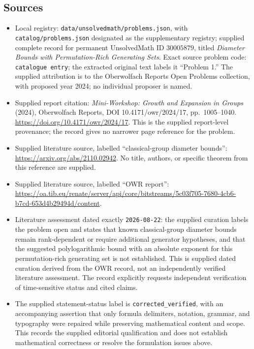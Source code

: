 \documentclass[11pt]{article}
\begin{document}
\subsection{Sources}
\begin{itemize}
\item Local registry: \texttt{data/unsolvedmath/problems.json}, with \texttt{catalog/problems.json} designated as the supplementary registry; supplied complete record for permanent UnsolvedMath ID \(30005879\), titled \emph{Diameter Bounds with Permutation-Rich Generating Sets}. Exact source problem code: \texttt{catalogue entry}; the extracted original text labels it ``Problem 1.'' The supplied attribution is to the Oberwolfach Reports Open Problems collection, with proposed year 2024; no individual proposer is named.
\item Supplied report citation: \emph{Mini-Workshop: Growth and Expansion in Groups} (2024), Oberwolfach Reports, DOI 10.4171/owr/2024/17, pp.\ 1005--1040. \url{https://doi.org/10.4171/owr/2024/17}. This is the supplied report-level provenance; the record gives no narrower page reference for the problem.
\item Supplied literature source, labelled ``classical-group diameter bounds'': \url{https://arxiv.org/abs/2110.02942}. No title, authors, or specific theorem from this reference are supplied.
\item Supplied literature source, labelled ``OWR report'': \url{https://oa.tib.eu/renate/server/api/core/bitstreams/5c03f705-7680-4cb6-b7cd-653d4b29494d/content}.
\item Literature assessment dated exactly \texttt{2026-08-22}: the supplied curation labels the problem open and states that known classical-group diameter bounds remain rank-dependent or require additional generator hypotheses, and that the suggested polylogarithmic bound with an absolute exponent for this permutation-rich generating set is not established. This is supplied dated curation derived from the OWR record, not an independently verified literature assessment. The record explicitly requests independent verification of time-sensitive status and cited claims.
\item The supplied statement-status label is \texttt{corrected\_verified}, with an accompanying assertion that only formula delimiters, notation, grammar, and typography were repaired while preserving mathematical content and scope. This records the supplied editorial qualification and does not establish mathematical correctness or resolve the formulation issues above.
\end{itemize}
\end{document}
